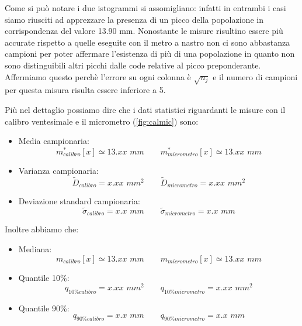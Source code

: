 Come si può notare i due istogrammi si assomigliano: infatti in entrambi i casi
siamo riusciti ad apprezzare la presenza di un picco della popolazione in
corrispondenza del valore 13.90 mm. Nonostante le misure risultino essere
più accurate rispetto a quelle eseguite con il metro a nastro non ci sono
abbastanza campioni per poter affermare l'esistenza di più di una popolazione
in quanto non sono distinguibili altri picchi dalle code relative al picco preponderante.
Affermiamo questo perchè l'errore su ogni colonna è $\sqrt{n_j}$ %
e il numero di campioni per questa misura risulta essere inferiore a 5.

\newpage
Più nel dettaglio possiamo dire che i dati statistici riguardanti le misure con il calibro ventesimale e il micrometro (\ref{fig:calmic}) sono:
\begin{itemize}
    \item{Media campionaria:}
        \begin{equation}
        m^*_{calibro}[x] \simeq 13.xx\,\,mm \qquad
        m^*_{micrometro}[x] \simeq 13.xx\,\,mm 
        \end{equation}

    \item{Varianza campionaria:}
        \begin{equation}
        \tilde{D}_{calibro} = x.xx\,\,mm^2 \qquad
        \tilde{D}_{micrometro} = x.xx\,\,mm^2
        \end{equation}

    \item{Deviazione standard campionaria:}
        \begin{equation}
        \tilde{\sigma}_{calibro} = x.x\,\,mm \qquad
        \tilde{\sigma}_{micrometro} = x.x\,\,mm
        \end{equation}
\end{itemize}
Inoltre abbiamo che:

\begin{itemize}
    \item{Mediana:}
        \begin{equation}
        m_{calibro}[x] \simeq 13.xx\,\,mm \qquad
        m_{micrometro}[x] \simeq 13.xx\,\,mm 
        \end{equation}

    \item{Quantile 10\%:}
        \begin{equation}
        q_{10\%calibro} = x.xx\,\,mm^2 \qquad
        q_{10\%micrometro} = x.xx\,\,mm^2
        \end{equation}

    \item{Quantile 90\%:}
        \begin{equation}
        q_{90\%calibro} = x.x\,\,mm \qquad
        q_{90\%micrometro} = x.x\,\,mm
        \end{equation}
\end{itemize}

